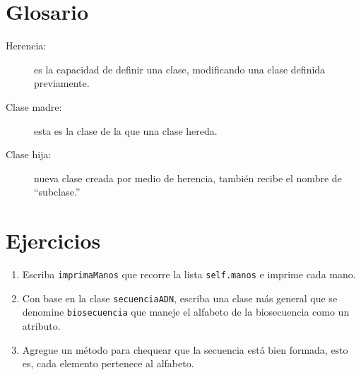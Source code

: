 \section{Glosario}
\begin{description}
\item [{Herencia:}] es la capacidad de definir una clase, modificando una
clase definida previamente.
\item [{Clase madre:}] esta es la clase de la que una clase hereda.
\item [{Clase hija:}] nueva clase creada por medio de herencia, también
recibe el nombre de ``subclase.''

   
\end{description}

\section{Ejercicios}
\begin{enumerate}
\item Escriba \texttt{imprimaManos} que recorre la lista \texttt{self.manos}
e imprime cada mano.
\item Con base en la clase \texttt{secuenciaADN}, escriba una clase más
general que se denomine \texttt{biosecuencia} que maneje el alfabeto
de la biosecuencia como un atributo.
\item Agregue un método para chequear que la secuencia está bien formada,
esto es, cada elemento pertenece al alfabeto.
\end{enumerate}

